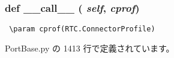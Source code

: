 \subsubsection{\setlength{\rightskip}{0pt plus 5cm}def \_\-\_\-call\_\-\_\- ( {\em self},  {\em cprof})}\label{classsource__py_1_1_port_base_1_1_port_base_1_1find__conn__id_e844e0019d38360a86bac1474132db3c}




\footnotesize\begin{verbatim}
 \param cprof(RTC.ConnectorProfile)
\end{verbatim}
\normalsize
 

 PortBase.py の 1413 行で定義されています。
